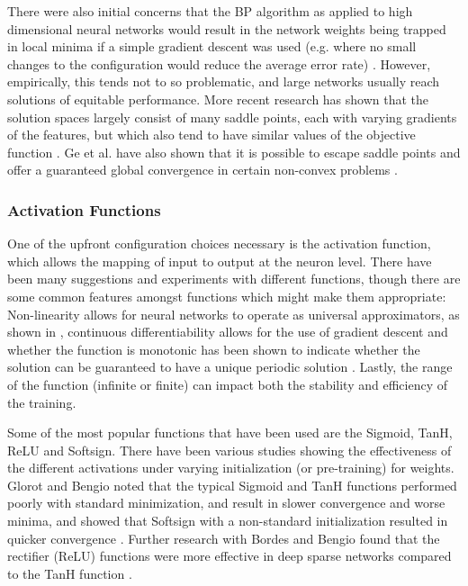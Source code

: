 \documentclass[a4paper,11pt,oneside]{article}
\theoremstyle{plain}
\theoremstyle{definition}
\begin{document}
	There were also initial concerns that the BP algorithm as applied to high dimensional neural networks would result 
	in the network weights being trapped in local minima if a simple gradient descent was used (e.g. where no small 
	changes to the configuration would reduce the average error rate) \cite{LeCun4}. 
	However, empirically, this tends not to so problematic, and large networks usually reach solutions of equitable 
	performance. More recent research has shown that the solution spaces largely consist of many saddle points, each 
	with varying gradients of the features, but which also tend to have similar values of the objective function \cite{Dauphin}. 
	Ge et al. have also shown that it is possible to escape saddle points and offer a guaranteed global convergence 
	in certain non-convex problems \cite{Ge}.
	\hfill \break 
	
	\subsubsection{Activation Functions}\label{lr_activationfunctions}
	
	One of the upfront configuration choices necessary is the activation function, which allows the mapping of input 
	to output at the neuron level. There have been many suggestions and experiments with different functions, though 
	there are some common features amongst functions which might make them appropriate: Non-linearity allows for 
	neural networks to operate as universal approximators, as shown in \cite{Hornik}, continuous differentiability allows for the 
	use of gradient descent and whether the function is monotonic has been shown to indicate whether the solution 
	can be guaranteed to have a unique periodic solution \cite{Wu}. Lastly, the range of the function (infinite or finite) can impact both the 
	stability and efficiency of the training.
	\hfill \break 
	
	Some of the most popular functions that have been used are the Sigmoid, TanH, ReLU and Softsign. There have 
	been various studies showing the effectiveness of the different activations under varying initialization (or pre-training) 
	for weights. Glorot and Bengio noted that the typical Sigmoid and TanH functions performed poorly with standard 
	minimization, and result in slower convergence and worse minima, and showed that Softsign with a non-standard 
	initialization resulted in quicker convergence \cite{Glorot}. Further research with Bordes and Bengio found that the 
	rectifier (ReLU) functions were  more effective in deep sparse networks compared to the TanH function \cite{Glorot2}.
	
\end{document}

